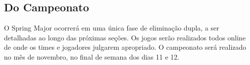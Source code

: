 \subsection{Do Campeonato}

O Spring Major ocorrerá em uma única fase de eliminação dupla, a ser detalhadas ao longo das próximas seções. Os jogos serão realizados todos online de onde os times e jogadores julgarem apropriado. O campeonato será realizado no mês de novembro, no final de semana dos dias 11 e 12.

